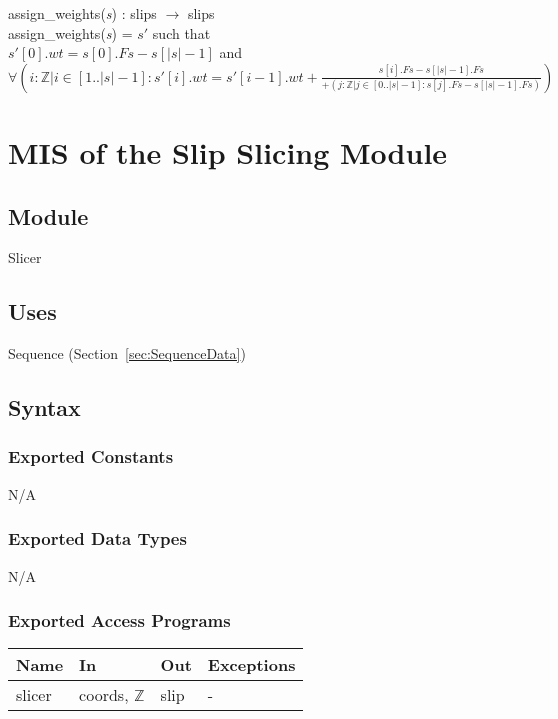 \documentclass[12pt, titlepage]{article}
\begin{document}
\noindent assign\_weights(\textit{s}) : slips $\rightarrow$ slips\\
assign\_weights(\textit{s}) = $s'$ such that\\
$s'[0].wt = s[0].Fs - s[|s|-1]$ and \\
$\forall(i : \mathbb{Z} | i \in [1..|s|-1] : s'[i].wt = s'[i-1].wt + 
\frac{s[i].Fs - s[|s|-1].Fs}{+(j : \mathbb{Z} | j \in [0..|s|-1] : s[j].Fs - 
s[|s|-1].Fs)})$\\


\section{MIS of the Slip Slicing Module} \label{sec:SlicerMod}

\subsection{Module}
Slicer

\subsection{Uses}
Sequence (Section~\ref{sec:SequenceData})

\subsection{Syntax}

\subsubsection{Exported Constants}
N/A

\subsubsection{Exported Data Types}
N/A

\subsubsection{Exported Access Programs}

\begin{center}
	\renewcommand*{\arraystretch}{1.5}
	\begin{tabular} {p{}  p{}  p{} 
			p{} } \hline 
		\textbf{Name} & \textbf{In} & \textbf{Out} & \textbf{Exceptions} \\ 
		\hline
		slicer & coords, $\mathbb{Z}$ & slip & - \\ \hline
		
	\end{tabular}
\end{center}
\end{document}
